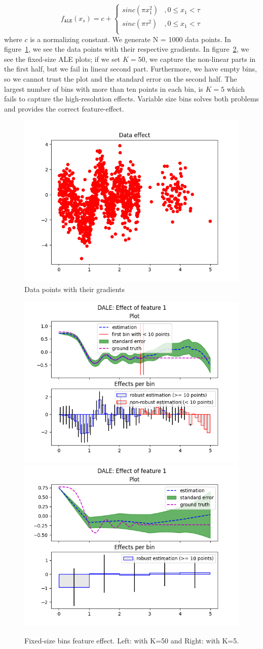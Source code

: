 \documentclass{article}
\begin{document}
\begin{equation} \label{eq:bullet-4-gt-ale}
  f_{\mathtt{ALE}}(x_s) = c +
  \begin{cases}
    sinc(\pi x_1^2)  &,  0  \leq x_1 < \tau \\
    sinc(\pi \tau^2)  &,  0  \leq x_1 < \tau \\
  \end{cases}
\end{equation}
%
where \(c\) is a normalizing constant. We generate N = 1000 data
points. In figure~\ref{fig:bullet-4-im-1}, we see the data points with
their respective gradients. In figure~\ref{fig:bullet-4-im-2}, we see
the fixed-size ALE plots; if we set \(K=50\), we capture the
non-linear parts in the first half, but we fail in linear second
part. Furthermore, we have empty bins, so we cannot trust the plot and
the standard error on the second half. The largest number of bins with
more than ten points in each bin, is \(K=5\) which fails to capture
the high-resolution effects. Variable size bins solves both problems
and provides the correct feature-effect.

\begin{figure}[!h]
  \centering
  \includegraphics[width=.49\linewidth]{bullet_4/im_1.png}
  \caption{Data points with their gradients}
  \label{fig:bullet-4-im-1}
\end{figure}

\begin{figure}[!h]
  \centering
  \includegraphics[width=.48\linewidth]{bullet_4/im_2.png}
  \includegraphics[width=.48\linewidth]{bullet_4/im_3.png}
  \caption{Fixed-size bins feature effect. Left: with K=50 and Right: with K=5.}
  \label{fig:bullet-4-im-2}
\end{figure}
\end{document}
